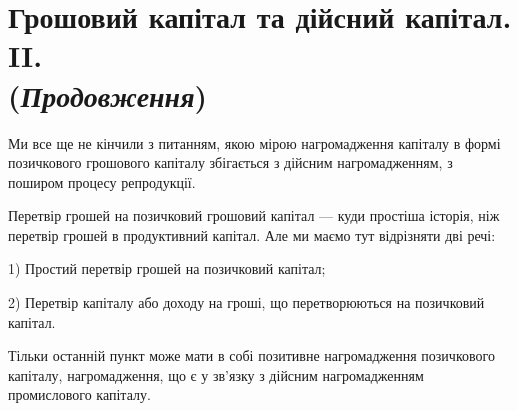 \section[Грошовий капітал та дійсний капітал. II. (Продовження)]{Грошовий капітал та дійсний капітал. II. \\ (\emph{Продовження})}

Ми все ще не кінчили з питанням, якою мірою нагромадження капіталу в
формі позичкового грошового капіталу збігається з дійсним нагромадженням,
з поширом процесу репродукції.

Перетвір грошей на позичковий грошовий капітал — куди простіша історія,
ніж перетвір грошей в продуктивний капітал. Але ми маємо тут відрізняти дві
речі:

1) Простий перетвір грошей на позичковий капітал;

2) Перетвір капіталу або доходу на гроші, що перетворюються на позичковий
капітал.

Тільки останній пункт може мати в собі позитивне нагромадження позичкового
капіталу, нагромадження, що є у зв’язку з дійсним нагромадженням
промислового капіталу.
